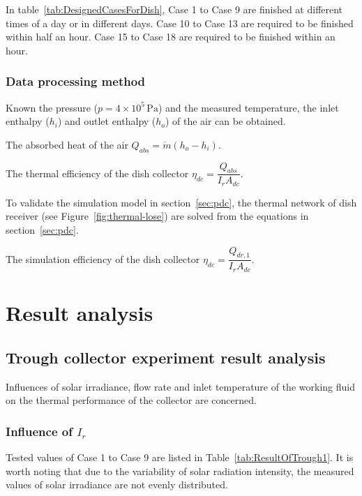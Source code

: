 In table~\ref{tab:DesignedCasesForDish}, Case 1 to Case 9 are finished at different times of a day or in different days. Case 10 to Case 13 are required to be finished within half an hour. Case 15 to Case 18 are required to be finished within an hour.

\subsubsection{Data processing method}
Known the pressure ($p = 4\times10^5\,\mathrm{Pa}$) and the measured temperature, the inlet enthalpy ($h_i$) and outlet enthalpy ($h_o$) of the air can be obtained.

The absorbed heat of the air $Q_{abs} = \dot{m}(h_o - h_i)$.

The thermal efficiency of the dish collector $\eta_{dc} = \dfrac{Q_{abs}}{I_r A_{dc}}$. 

To validate the simulation model in section~\ref{sec:pdc}, %
the thermal network of dish receiver (see Figure~\ref{fig:thermal-lose}) are solved from the equations in section~\ref{sec:pdc}.

The simulation efficiency of the dish collector $\eta_{dc} = \dfrac{Q_{dr,1}}{I_r A_{dc}}$.

\section{Result analysis}
\subsection{Trough collector experiment result analysis}
Influences of solar irradiance, flow rate and inlet temperature of the working fluid on the thermal performance of the collector are concerned.
\subsubsection{Influence of $I_r$}
Tested values of Case 1 to Case 9 are listed in Table~\ref{tab:ResultOfTrough1}. It is worth noting that due to the variability of solar radiation intensity, the measured values of solar irradiance are not evenly distributed.

